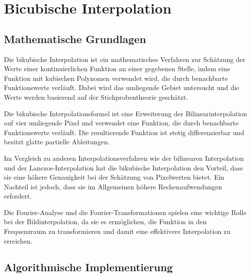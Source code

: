 \section{Bicubische Interpolation}

\subsection{Mathematische Grundlagen}


    
Die bikubische Interpolation ist ein mathematisches Verfahren zur Schätzung der Werte einer kontinuierlichen Funktion an einer gegebenen Stelle, indem eine Funktion mit kubischen Polynomen verwendet wird, die durch benachbarte Funktionswerte verläuft. Dabei wird das umliegende Gebiet untersucht und die Werte werden basierend auf der Stichprobentheorie geschätzt.

Die bikubische Interpolationsformel ist eine Erweiterung der Bilinearinterpolation auf vier umliegende Pixel und verwendet eine Funktion, die durch benachbarte Funktionswerte verläuft. Die resultierende Funktion ist stetig differenzierbar und besitzt glatte partielle Ableitungen.

Im Vergleich zu anderen Interpolationsverfahren wie der bilinearen Interpolation und der Lanczos-Interpolation hat die bikubische Interpolation den Vorteil, dass sie eine höhere Genauigkeit bei der Schätzung von Pixelwerten bietet. Ein Nachteil ist jedoch, dass sie im Allgemeinen höhere Rechenaufwendungen erfordert.

Die Fourier-Analyse und die Fourier-Transformationen spielen eine wichtige Rolle bei der Bildinterpolation, da sie es ermöglichen, die Funktion in den Frequenzraum zu transformieren und damit eine effektivere Interpolation zu erreichen.

\subsection{Algorithmische Implementierung}


